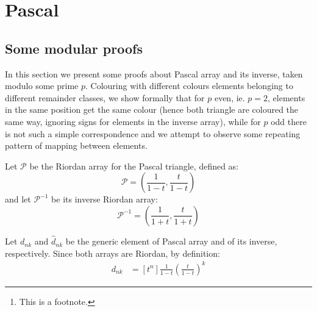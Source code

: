 \documentclass[10pt,a4paper]{article} %
\begin{document}
    \title{\rmfamily\normalfont{}}
    \author{ \\ }
    \date{\today} 
    
    \maketitle
    
    \begin{abstract}
        \noindent\lipsum[1] Just a test.\footnote{This is a footnote.}
    \end{abstract}
       
    \tableofcontents
    
    \section{Pascal}

    \subsection{Some modular proofs}
    
    In this section we present some proofs about Pascal array and its inverse,
    taken modulo some prime $p$. Colouring with different colours elements 
    belonging to different remainder classes, we show formally that for $p$ 
    even, ie. $p=2$, elements in the same position get the same colour (hence
    both triangle are coloured the same way, ignoring signs for elements in the
    inverse array), while for $p$ odd there is not such a simple correspondence 
    and we attempt to observe some repeating pattern of mapping between elements.

    Let $\mathcal{P}$ be the Riordan array for the Pascal triangle, defined as:
    \begin{displaymath} 
        \mathcal{P} = \left(\frac{1}{1-t}, \frac{t}{1-t}  \right)
    \end{displaymath} 
    and let $\mathcal{P}^{-1}$ be its inverse Riordan array:
    \begin{displaymath} 
        \mathcal{P}^{-1} = \left(\frac{1}{1+t}, \frac{t}{1+t}  \right)
    \end{displaymath} 
    
    Let $d_{nk}$ and $\hat{d}_{nk}$ be the generic element of Pascal array and 
    of its inverse, respectively. Since both arrays are Riordan, by definition:
    \begin{displaymath}
        \begin{split}
            d_{nk} &= [t^n]\frac{1}{1-t}\left(\frac{t}{1-t}\right)^k
        \end{split}
    \end{displaymath}
\end{document}
